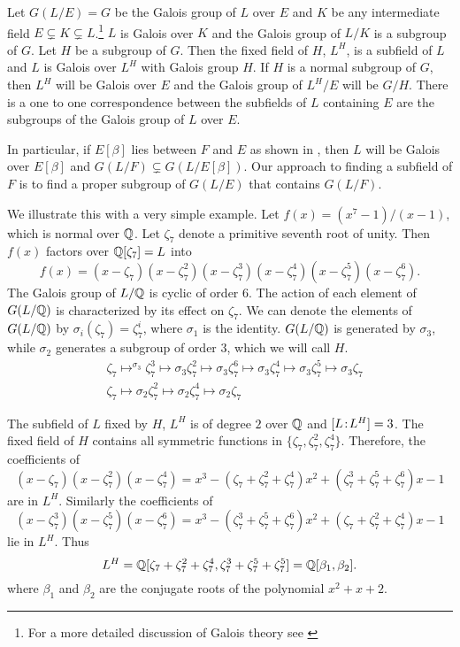 Let $G(L/E) = G$ be the Galois group of $L$ over $E$ and $K$ be any
intermediate field $E \varsubsetneq K \varsubsetneq L$.\footnote{For a more
detailed discussion of Galois theory see \cite{Lang1992-uk}} $L$ is Galois
over $K$ and the Galois group of $L/K$ is a subgroup of $G$.  Let $H$ be a
subgroup of $G$.  Then the fixed field of $H$, $L^H$, is a subfield of $L$
and $L$ is Galois over $L^H$ with Galois group $H$.  If $H$ is a normal
subgroup of $G$, then $L^H$ will be Galois over $E$ and the Galois group of
$L^H/E$ will be $G/H$.  There is a one to one correspondence between the
subfields of $L$ containing $E$ are the subgroups of the Galois group of
$L$ over $E$.

In particular, if $E[\beta]$ lies between $F$ and $E$ as shown in
, then $L$ will be Galois over
$E[\beta]$ and $G(L/F) \varsubsetneq G(L/E[\beta])$.  Our approach to
finding a subfield of $F$ is to find a proper subgroup of $G(L/E)$ that
contains $G(L/F)$.

We illustrate this with a very simple example.  Let $f(x)= (x^7-1)/(x-1)$,
which is normal over $\mathbb{Q}$.  Let $\zeta_7$ denote a primitive seventh root
of unity.  Then $f(x)$ factors over $\mathbb{Q}[\zeta_7]=L$ into
\[
f(x) = (x - \zeta_7) (x - \zeta_7^2) (x - \zeta_7^3) (x - \zeta_7^4) (x -
\zeta_7^5) (x - \zeta_7^6).
\]
The Galois group of $L/\mathbb{Q}$ is cyclic of order $6$.  The action of each
element of $G(L/\mathbb{Q})$ is characterized by its effect on $\zeta_7$.  We can
denote the elements of $G(L/\mathbb{Q})$ by $\sigma_i(\zeta_7) = \zeta_7^i$, where
$\sigma_1$ is the identity.  $G(L/\mathbb{Q})$ is generated by $\sigma_3$, while
$\sigma_2$ generates a subgroup of order $3$, which we will call $H$.
\[
\begin{aligned}
& \zeta_7 \mapsto^{\sigma_3} \zeta_7^3 \mapsto{\sigma_3} \zeta_7^2
\mapsto{\sigma_3} \zeta_7^6 \mapsto{\sigma_3} \zeta_7^4
\mapsto{\sigma_3} \zeta_7^5 \mapsto{\sigma_3} \zeta_7 \\ & \zeta_7
\mapsto{\sigma_2} \zeta_7^2 \mapsto{\sigma_2} \zeta_7^4
\mapsto{\sigma_2} \zeta_7
\end{aligned}
\]

The subfield of $L$ fixed by $H$, $L^H$ is of degree $2$ over $\mathbb{Q}$ and
$[L\!:\!L^H]=3$.  The fixed field of $H$ contains all symmetric
functions in $\{ \zeta_7, \zeta_7^2, \zeta_7^4 \}$.  Therefore, the
coefficients of
\[
(x - \zeta_7)(x - \zeta_7^2)(x - \zeta_7^4) = x^3- (\zeta_7 + \zeta_7^2 +
\zeta_7^4)x^2 + (\zeta_7^3 + \zeta_7^5 + \zeta_7^6)x - 1
\]
are in $L^H$.  Similarly the coefficients of
\[
(x - \zeta_7^3)(x - \zeta_7^5)(x - \zeta_7^6) = x^3- (\zeta_7^3 + \zeta_7^5
+ \zeta_7^6)x^2 + (\zeta_7 + \zeta_7^2 + \zeta_7^4)x - 1
\]
lie in $L^H$.  Thus
\[
L^H = \mathbb{Q}[\zeta_7 + \zeta_7^2 + \zeta_7^4, \zeta_7^3+\zeta_7^5+\zeta_7^5] =
\mathbb{Q}[\beta_1, \beta_2].
\]
where $\beta_1$ and $\beta_2$ are the conjugate roots of the polynomial
$x^2+x+2$.

